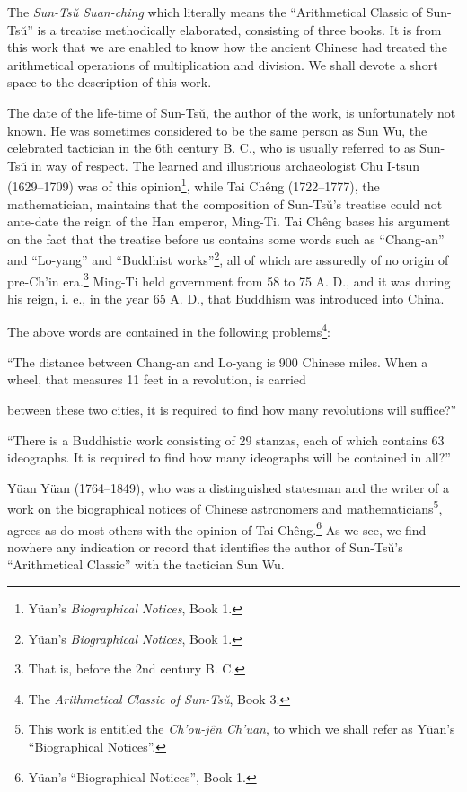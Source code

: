 \documentclass[11pt]{article}
\newcommand{\scanpage}[2]{\clearpage\setcounter{footnote}{0}\noindent{\footnotesize\color{gray}PDF page #1 · #2}\par\medskip}
\newcommand{\scanfooter}{}
\begin{document}
The \emph{Sun-Tsŭ Suan-ching} which literally means the ``Arithmetical Classic of Sun-Tsŭ'' is a treatise methodically elaborated, consisting of three books. It is from this work that we are enabled to know how the ancient Chinese had treated the arithmetical operations of multiplication and division. We shall devote a short space to the description of this work.

The date of the life-time of Sun-Tsŭ, the author of the work, is unfortunately not known. He was sometimes considered to be the same person as Sun Wu, the celebrated tactician in the 6th century B. C., who is usually referred to as Sun-Tsŭ in way of respect. The learned and illustrious archaeologist Chu I-tsun (1629--1709) was of this opinion\footnote{Yüan's \emph{Biographical Notices}, Book 1.}, while Tai Chêng (1722--1777), the mathematician, maintains that the composition of Sun-Tsŭ's treatise could not ante-date the reign of the Han emperor, Ming-Ti. Tai Chêng bases his argument on the fact that the treatise before us contains some words such as ``Chang-an'' and ``Lo-yang'' and ``Buddhist works''\footnote{Yüan's \emph{Biographical Notices}, Book 1.}, all of which are assuredly of no origin of pre-Ch'in era.\footnote{That is, before the 2nd century B. C.} Ming-Ti held government from 58 to 75 A. D., and it was during his reign, i. e., in the year 65 A. D., that Buddhism was introduced into China.

The above words are contained in the following problems\footnote{The \emph{Arithmetical Classic of Sun-Tsŭ}, Book 3.}:

``The distance between Chang-an and Lo-yang is 900 Chinese miles. When a wheel, that measures 11 feet in a revolution, is carried
\scanfooter

\scanpage{0040}{Chapter 4, printed page 26}
\setcounter{footnote}{0}
between these two cities, it is required to find how many revolutions will suffice?''

``There is a Buddhistic work consisting of 29 stanzas, each of which contains 63 ideographs. It is required to find how many ideographs will be contained in all?''

Yüan Yüan (1764--1849), who was a distinguished statesman and the writer of a work on the biographical notices of Chinese astronomers and mathematicians\footnote{This work is entitled the \emph{Ch'ou-jên Ch'uan}, to which we shall refer as Yüan's ``Biographical Notices''.}, agrees as do most others with the opinion of Tai Chêng.\footnote{Yüan's ``Biographical Notices'', Book 1.} As we see, we find nowhere any indication or record that identifies the author of Sun-Tsŭ's ``Arithmetical Classic'' with the tactician Sun Wu.
\end{document}
